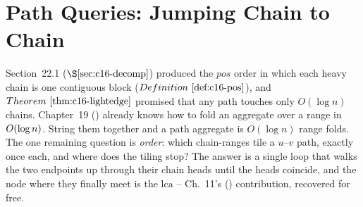 \section{Path Queries: Jumping Chain to Chain}\label{sec:c16-pathq}

\begin{previouslybox}
Section~22.1 (\(\secref{c16-decomp}\)) produced the \(\mathit{pos}\) order in which each heavy chain is one contiguous block (\(\defref{c16-pos}\)), and \(\thmref{c16-lightedge}\) promised that any path touches only \(O(\log n)\) chains.  Chapter~19 () already knows how to fold an aggregate over a range in \(O(\log n)\).  String them together and a path aggregate is \(O(\log n)\) range folds.  The one remaining question is \emph{order}: which chain-ranges tile a \(u\)--\(v\) path, exactly once each, and where does the tiling stop?  The answer is a single loop that walks the two endpoints up through their chain heads until the heads coincide, and the node where they finally meet is the \(\mathrm{lca}\) -- Ch.~11's () contribution, recovered for free.
\end{previouslybox}

